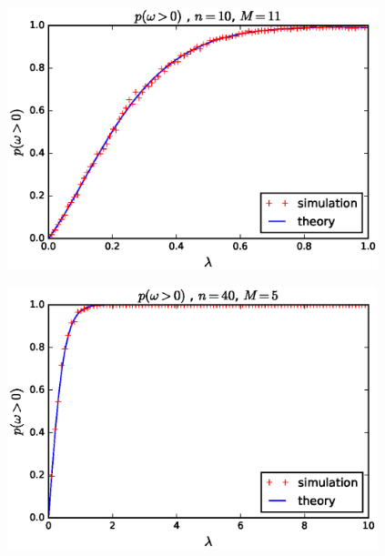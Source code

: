 \documentclass[10pt]{beamer}
\begin{document}
\begin{frame}
\begin{figure}[b]
\centering
\includegraphics[height=3in]{p_nonzero_n10_m11}
\end{figure}
\end{frame}

\begin{frame}
\begin{figure}[b]
\centering
\includegraphics[height=3in]{p_nonzero_n40_m5}
\end{figure}
\end{frame}
\end{document}
